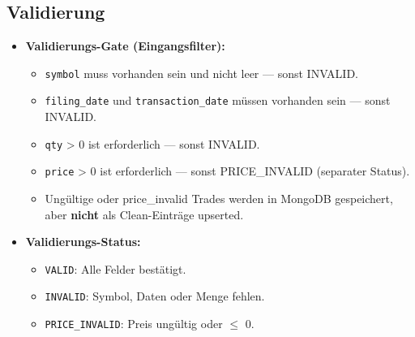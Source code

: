 \subsection{Validierung}
\begin{itemize}
  \item \textbf{Validierungs-Gate (Eingangsfilter):} %
    \begin{itemize}
      \item \texttt{symbol} muss vorhanden sein und nicht leer — sonst INVALID.
      \item \texttt{filing\_date} und \texttt{transaction\_date} müssen vorhanden sein — sonst INVALID.
      \item \texttt{qty} > 0 ist erforderlich — sonst INVALID.
      \item \texttt{price} > 0 ist erforderlich — sonst PRICE\_INVALID (separater Status). %
      \item Ungültige oder price\_invalid Trades werden in MongoDB gespeichert, aber \textbf{nicht} als Clean-Einträge upserted. %
    \end{itemize}
  \item \textbf{Validierungs-Status:} %
    \begin{itemize}
      \item \texttt{VALID}: Alle Felder bestätigt.
      \item \texttt{INVALID}: Symbol, Daten oder Menge fehlen.
      \item \texttt{PRICE\_INVALID}: Preis ungültig oder $\leq$ 0.
    \end{itemize}
\end{itemize}

